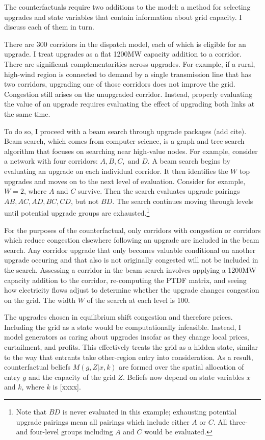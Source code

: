 \documentclass[12pt]{article}
\begin{document}
The counterfactuals require two additions to the model: a method for selecting upgrades and state variables that contain information about grid capacity. I discuss each of them in turn. 

There are 300 corridors in the dispatch model, each of which is eligible for an upgrade. I treat upgrades as a flat 1200MW capacity addition to a corridor. There are significant complementarities across upgrades. For example, if a rural, high-wind region is connected to demand by a single transmission line that has two corridors, upgrading one of those corridors does not improve the grid. Congestion still arises on the unupgraded corridor. Instead, properly evaluating the value of an upgrade requires evaluating the effect of upgrading both links at the same time. 

To do so, I proceed with a beam search through upgrade packages (add cite). Beam search, which comes from computer science, is a graph and tree search algorithm that focuses on searching near high-value nodes. For example, consider a network with four corridors: $A, B, C, \text{ and } D$. A beam search begins by evaluating an upgrade on each individual corridor. It then identifies the $W$ top upgrades and moves on to the next level of evaluation. Consider for example, $W=2$, where $A$ and $C$ survive. Then the search evaluates upgrade pairings $AB, AC, AD, BC, CD$, but not $BD$. The search continues moving through levels until potential upgrade groups are exhausted.\footnote{Note that $BD$ is never evaluated in this example; exhausting potential upgrade pairings mean all pairings which include either $A$ or $C$. All three- and four-level groups including $A$ and $C$ would be evaluated.}

For the purposes of the counterfactual, only corridors with congestion or corridors which reduce congestion elsewhere following an upgrade are included in the beam search. Any corridor upgrade that only becomes valuable conditional on another upgrade occuring and that also is not originally congested will not be included in the search. Assessing a corridor in the beam search involves applying a 1200MW capacity addition to the corridor, re-computing the PTDF matrix, and seeing how electricity flows adjust to determine whether the upgrade changes congestion on the grid. The width $W$ of the search at each level is 100.

The upgrades chosen in equilibrium shift congestion and therefore prices. Including the grid as a state would be computationally infeasible. Instead, I model generators as caring about upgrades insofar as they change local prices, curtailment, and profits. This effectively treats the grid as a hidden state, similar to the way that entrants take other-region entry into consideration. As a result, counterfactual beliefs $M(g,Z|x,k)$ are formed over the spatial allocation of entry $g$ and the capacity of the grid $Z$. Beliefs now depend on state variables $x$ and $k$, where $k$ is [xxxx]. 
\end{document}
